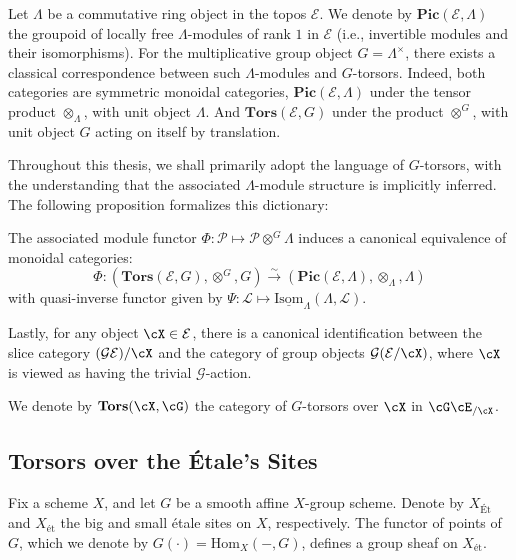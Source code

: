 Let $\Lambda$ be a commutative ring object in the topos $\mathcal{E}$. 
We denote by $\mathbf{Pic}(\mathcal{E}, \Lambda)$ the groupoid of locally free $\Lambda$-modules of rank $1$ in
$\mathcal{E}$ (i.e., invertible modules and their isomorphisms).
For the multiplicative group object $G = \Lambda^\times$, 
there exists a classical correspondence between such $\Lambda$-modules and $G$-torsors. 
Indeed, both categories are symmetric monoidal categories, $\mathbf{Pic}(\mathcal{E}, \Lambda)$ under the tensor product $\otimes_\Lambda$, with unit object $\Lambda$.
And $\mathbf{Tors}(\mathcal{E}, G)$ under the product $\otimes^G$, with unit object $G$ acting on itself by translation.

Throughout this thesis, we shall primarily adopt the language of $G$-torsors, with the understanding that the
associated $\Lambda$-module structure is implicitly inferred.
The following proposition formalizes this dictionary:

\begin{prop}
    \label{prop:torsor_module_equivalence}
    The associated module functor $\Phi: \mathcal{P} \mapsto \mathcal{P} \otimes^G \Lambda$ 
    induces a canonical equivalence of monoidal categories:
    $$\Phi: (\mathbf{Tors}(\mathcal{E}, G), \otimes^G, G) \xrightarrow{\sim} (\mathbf{Pic}(\mathcal{E}, \Lambda), 
    \otimes_\Lambda, \Lambda)$$
    with quasi-inverse functor given by
    $\Psi: \mathcal{L} \mapsto \underline{\mathrm{Isom}}_\Lambda(\Lambda, \mathcal{L})$.
\end{prop}

Lastly, for any object $\cX \in \mathcal{E}$, there is a canonical identification between the slice category
$(\mathcal{G}\mathcal{E})/\cX$ and the category of group objects $\mathcal{G}(\mathcal{E}/\cX)$, where $\cX$ is viewed as having the 
trivial $\mathcal{G}$-action.

We denote by $\mathbf{Tors}(\cX, \cG)$ the category of $G$-torsors over $\cX$ in $\cG \cE_{/\cX}$.

\subsection{Torsors over the \'Etale's Sites}
Fix a scheme $X$, and let $G$ be a smooth affine $X$-group scheme. 
Denote by $X_{\text{Ét}}$ and $X_{\text{ét}}$ the big and small étale sites on $X$, respectively. 
The functor of points of $G$, which we denote by $G(\cdot) = \mathrm{Hom}_X(-, G)$, defines a group sheaf on 
$X_{\text{ét}}$.

